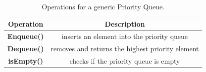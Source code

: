 \begin{table}[]
\centering
\begin{tabular}{|c|c|}
\hline

\textbf{Operation}   & \textbf{Description}    \\ \hline

	\textbf{Enqueue()}       	& inserts an element into the priority queue                        \\ \hline
	\textbf{Dequeue()}		& removes and returns the highest priority element 		\\ \hline
	\textbf{isEmpty()}			& checks if the priority queue is empty 					\\ \hline

\end{tabular}
\caption{\footnotesize{Operations for a generic Priority Queue.}
\label{tab:PQ_API}}
\end{table}


